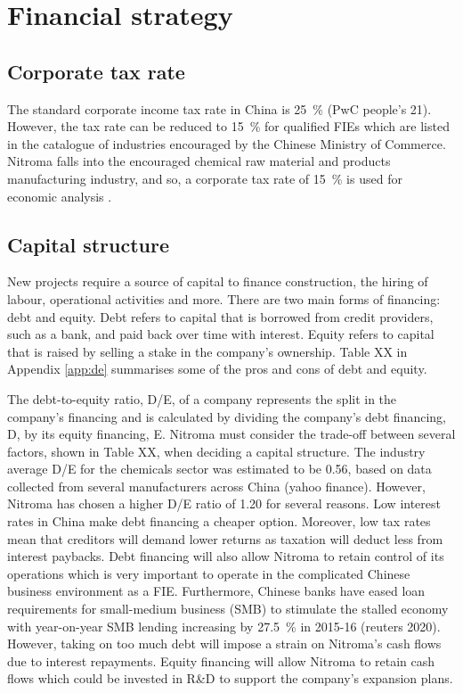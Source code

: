 \section{Financial strategy}
\subsection{Corporate tax rate}
\label{sec:tax}
The standard corporate income tax rate in China is \SI{25}{\percent} (PwC people's 21). However, the tax rate can be reduced to \SI{15}{\percent} for qualified FIEs which are listed in the catalogue of industries encouraged by the Chinese Ministry of Commerce. Nitroma falls into the encouraged chemical raw material and products manufacturing industry, and so, a corporate tax rate of \SI{15}{\percent} is used for economic analysis \cite{ministry_of_commerce_china_catalouge_2020}.

\subsection{Capital structure}
\label{sec:de-ratio}
New projects require a source of capital to finance construction, the hiring of labour, operational activities and more. There are two main forms of financing: debt and equity. Debt refers to capital that is borrowed from credit providers, such as a bank, and paid back over time with interest. Equity refers to capital that is raised by selling a stake in the company’s ownership. Table XX in Appendix \ref{app:de} summarises some of the pros and cons of debt and equity.

The debt-to-equity ratio, D/E, of a company represents the split in the company’s financing and is calculated by dividing the company’s debt financing, D, by its equity financing, E. Nitroma must consider the trade-off between several factors, shown in Table XX, when deciding a capital structure. The industry average D/E for the chemicals sector was estimated to be 0.56, based on data collected from several manufacturers across China (yahoo finance). However, Nitroma has chosen a higher D/E ratio of 1.20 for several reasons. Low interest rates in China make debt financing a cheaper option. Moreover, low tax rates mean that creditors will demand lower returns as taxation will deduct less from interest paybacks. Debt financing will also allow Nitroma to retain control of its operations which is very important to operate in the complicated Chinese business environment as a FIE. Furthermore, Chinese banks have eased loan requirements for small-medium business (SMB) to stimulate the stalled economy with year-on-year SMB lending increasing by \SI{27.5}{\percent} in 2015-16 (reuters 2020). However, taking on too much debt will impose a strain on Nitroma’s cash flows due to interest repayments. Equity financing will allow Nitroma to retain cash flows which could be invested in R\&D to support the company’s expansion plans.

